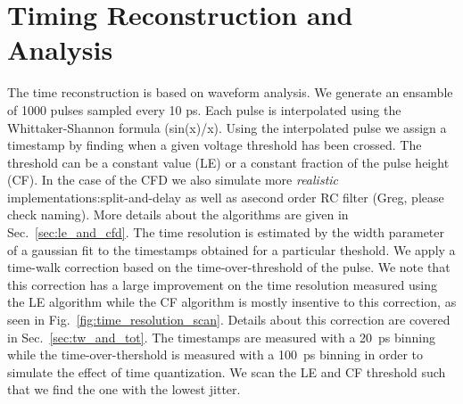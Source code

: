 \documentclass[preprint,1p]{elsarticle}
\begin{document}
\section{Timing Reconstruction and Analysis}\label{sec:timing_and_analysis}
The time reconstruction is based on waveform analysis. We generate an ensamble of 1000 pulses sampled every 10 ps.
Each pulse is interpolated using the Whittaker-Shannon formula (sin(x)/x). Using the interpolated pulse we assign a timestamp by finding when
a given voltage threshold has been crossed. The threshold can be a constant value (LE) or a constant fraction
 of the pulse height (CF).
In the case of the CFD we also simulate more \textit{realistic} implementations:{\color{red}split-and-delay as well as asecond order RC filter (Greg, please check naming)}.
 More details about the algorithms are given in Sec.~\ref{sec:le_and_cfd}. The time resolution is estimated by the width parameter
of a gaussian fit to the timestamps obtained for a particular theshold. We apply a time-walk correction based on the
time-over-threshold of the pulse. We note that this correction has a large improvement on the time resolution measured
using the LE algorithm while the CF algorithm is mostly insentive to this correction, as seen in Fig.~\ref{fig:time_resolution_scan}.
Details about this correction are covered in Sec.~\ref{sec:tw_and_tot}. The timestamps are measured with a
20~\si{ps} binning while the time-over-thershold is measured with a 100~\si{ps} binning in order to simulate the effect of time quantization.
We scan the LE and CF threshold such that we find the one with the lowest jitter.
\end{document}
